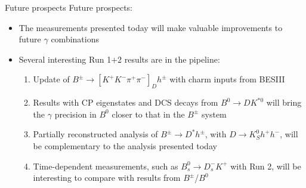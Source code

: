 \documentclass[dvipsnames]{beamer}
\begin{document}
\begin{frame}{Future prospects}
  \vspace{0.0cm}
  {\Large Future prospects:}
  \vspace{0.3cm}
  \begin{itemize}
    \setlength\itemsep{1.0em}
    \item{The measurements presented today will make valuable improvements to future $\gamma$ combinations}
    \item{Several interesting Run 1$+$2 results are in the pipeline:}
    \begin{enumerate}
      \setlength\itemsep{1.0em}
      \item{Update of $B^\pm\to[K^+K^-\pi^+\pi^-]_Dh^\pm$ with charm inputs from BESIII}
      \item{Results with CP eigenstates and DCS decays from $B^0\to DK^{*0}$ will bring the $\gamma$ precision in $B^0$ closer to that in the $B^\pm$ system}
      \item{Partially reconstructed analysis of $B^\pm\to D^*h^\pm$, with $D\to K_S^0h^+h^-$, will be complementary to the analysis presented today}
      \item{Time-dependent measurements, such as $B_s^0\to D_s^-K^+$ with Run 2, will be interesting to compare with results from $B^\pm$/$B^0$}
    \end{enumerate}
  \end{itemize}
\end{frame}
\end{document}
